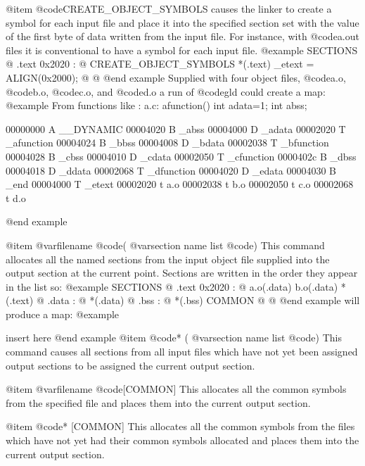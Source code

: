 @item @code{CREATE_OBJECT_SYMBOLS}
causes the linker to create a symbol for each input file and place it
into the specified section set with the value of the first byte of
data written from the input file.  For instance, with @code{a.out}
files it is conventional to have a symbol for each input file.
@example
        SECTIONS @{
                .text 0x2020 :
                         @{
                        CREATE_OBJECT_SYMBOLS
                        *(.text)
                        _etext = ALIGN(0x2000);
                        @}
                @}
@end example
Supplied with four object files, @code{a.o}, @code{b.o}, @code{c.o},
and @code{d.o} a run of
@code{gld} could create a map:
@example
From functions like :
a.c:
        afunction() { }
        int adata=1;
        int abss;

00000000 A __DYNAMIC
00004020 B _abss
00004000 D _adata
00002020 T _afunction
00004024 B _bbss
00004008 D _bdata
00002038 T _bfunction
00004028 B _cbss
00004010 D _cdata
00002050 T _cfunction
0000402c B _dbss
00004018 D _ddata
00002068 T _dfunction
00004020 D _edata
00004030 B _end
00004000 T _etext
00002020 t a.o
00002038 t b.o
00002050 t c.o
00002068 t d.o

@end example

@item @var{filename} @code{(} @var{section name list} @code{)}
This command allocates all the named sections from the input object
file supplied into the output section at the current point. Sections
are written in the order they appear in the list so:
@example
        SECTIONS @{
                .text 0x2020 :                
                        @{
                        a.o(.data)
                        b.o(.data)
                        *(.text)
                        @}
                .data :
                        @{
                        *(.data)
                        @}
                .bss :
                        @{
                        *(.bss)
                        COMMON
                        @}
        @}
@end example
will produce a map:
@example

        insert here 
@end example
@item @code{* (} @var{section name list} @code{)}
This command causes all sections from all input files which have not
yet been assigned output sections to be assigned the current output
section.

@item @var{filename} @code{[COMMON]}
This allocates all the common symbols from the specified file and places
them into the current output section.

@item @code{* [COMMON]}
This allocates all the common symbols from the files which have not
yet had their common symbols allocated and places them into the current
output section.

